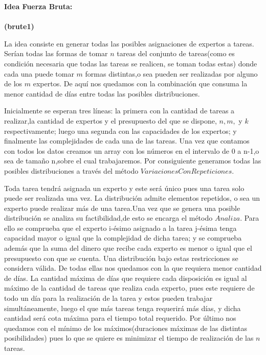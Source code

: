 \documentclass[10pt,letterpaper]{article}
\begin{document}
{ 	
 	
 	{\Large \bf Idea Fuerza Bruta:}\\ \\
 		{\small \bf (brute1)}
 	
 	La idea consiste en generar todas las posibles asignaciones de expertos a tareas. Ser\'ian todas las formas de tomar $n$ tareas del conjunto de tareas(como es condici\'on necesaria que todas las tareas se realicen, se toman todas estas) donde cada una puede tomar $m$ formas distintas,o sea pueden ser realizadas por alguno de los $m$ expertos. De aqu\'i nos quedamos con la combinaci\'on que consuma la menor cantidad de d\'ias entre todas las posibles distribuciones.
 	
 	Inicialmente se esperan tres l\'ineas: la primera con la cantidad de tareas a realizar,la cantidad de expertos y el presupuesto del que se dispone, $n, m,$ y $k$ respectivamente; luego una segunda con las capacidades de los expertos; y finalmente las complejidades de cada una de las tareas. Una vez que contamos con todos los datos creamos un array con los n\'umeros en el intervalo de 0 a n-1,o sea de tama\~no n,sobre el cual trabajaremos. Por consiguiente generamos todas las posibles distribuciones a trav\'es del m\'etodo $VariacionesConRepeticiones$.
 	
 	Toda tarea tendr\'a asignada un experto y este ser\'a \'unico pues una tarea solo puede ser realizada una vez. La distribuci\'on admite elementos repetidos, o sea un experto puede realizar m\'as de una tarea.Una vez que se genera una posible distribuci\'on se analiza su factibilidad,de esto se encarga el m\'etodo $Analiza$. Para ello se comprueba que el experto i-\'esimo asignado a la tarea j-\'esima tenga capacidad mayor o igual que la complejidad de dicha tarea; y se comprueba adem\'as que la suma del dinero que recibe cada experto es menor o igual que el presupuesto con que se cuenta. Una distribuci\'on bajo estas restricciones se considera v\'alida. De todas ellas nos quedamos con la que requiera menor cantidad de d\'ias. La cantidad m\'axima de d\'ias que requiere cada disposici\'on es igual al m\'aximo de la cantidad de tareas que realiza cada experto, pues este requiere de todo un d\'ia para la realizaci\'on de la tarea y estos pueden trabajar simult\'aneamente, luego el que m\'as tareas tenga requerir\'a m\'as d\'ias, y dicha cantidad ser\'a cota m\'axima para el tiempo total requerido. Por \'ultimo nos quedamos con el m\'inimo de los m\'aximos(duraciones m\'aximas de las distintas posibilidades) pues lo que se quiere es minimizar el tiempo de realizaci\'on de las $n$ tareas.
 	
}
\end{document}
